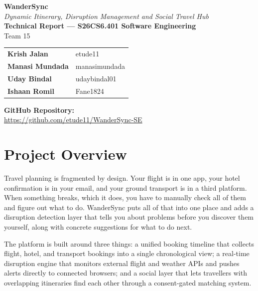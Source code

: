 \documentclass[12pt,a4paper]{article}
\begin{document}
\begin{center}
  \vspace*{1cm}
  {\LARGE\bfseries WanderSync}\\[0.3em]
  {\large\itshape Dynamic Itinerary, Disruption Management and Social Travel Hub}\\[1.5em]
  {\large\bfseries Technical Report --- S26CS6.401 Software Engineering}\\[0.5em]
  {\normalsize Team 15}\\[2em]

  \begin{tabular}{ll}
    \textbf{Krish Jalan}    & etude11 \\
    \textbf{Manasi Mundada} & manasimundada \\
    \textbf{Uday Bindal}    & udaybindal01 \\
    \textbf{Ishaan Romil}   & Fane1824 \\
  \end{tabular}

  \vspace{2em}
  \textbf{GitHub Repository:}\\[0.3em]
  \url{https://github.com/etude11/WanderSync-SE}
\end{center}

\newpage

\section{Project Overview}

Travel planning is fragmented by design. Your flight is in one app, your hotel confirmation is
in your email, and your ground transport is in a third platform. When something breaks, which it
does, you have to manually check all of them and figure out what to do. WanderSync puts all of
that into one place and adds a disruption detection layer that tells you about problems before
you discover them yourself, along with concrete suggestions for what to do next.

The platform is built around three things: a unified booking timeline that collects flight, hotel,
and transport bookings into a single chronological view; a real-time disruption engine that
monitors external flight and weather APIs and pushes alerts directly to connected browsers; and a
social layer that lets travellers with overlapping itineraries find each other through a
consent-gated matching system.
\end{document}
